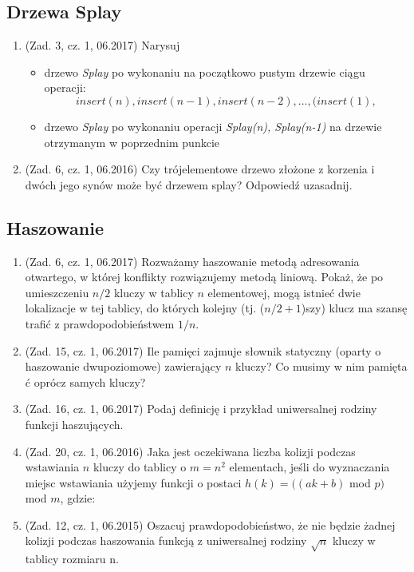 \documentclass[10pt]{article}%
\begin{document}
\subsection*{Drzewa Splay}

\begin{enumerate}

\item (Zad. 3, cz. 1, 06.2017) Narysuj 
\begin{itemize}
	\item drzewo \emph{Splay} po wykonaniu na początkowo pustym drzewie ciągu operacji: $$insert(n),insert(n-1),insert(n-2),...,(insert(1),$$
	\item drzewo \emph{Splay} po wykonaniu operacji \emph{Splay(n), Splay(n-1)} na drzewie otrzymanym w poprzednim punkcie
\end{itemize}

\item (Zad. 6, cz. 1, 06.2016) Czy trójelementowe drzewo złożone z korzenia i dwóch jego synów może być drzewem splay? Odpowiedź uzasadnij.

\end{enumerate}


\subsection*{Haszowanie}

\begin{enumerate}

\item (Zad. 6, cz. 1, 06.2017) Rozważamy haszowanie metodą adresowania otwartego, w której konflikty rozwiązujemy metodą liniową. Pokaż, że po umieszczeniu $n/2$ kluczy w tablicy $n$ elementowej, mogą istnieć dwie lokalizacje w tej tablicy, do których kolejny (tj. ($n/2 + 1$)szy) klucz ma szansę trafić z prawdopodobieństwem $1/n$.

\item (Zad. 15, cz. 1, 06.2017) Ile pamięci zajmuje słownik statyczny (oparty o haszowanie dwupoziomowe) zawierający $n$ kluczy? Co musimy w nim pamięta ć oprócz samych kluczy?

\item (Zad. 16, cz. 1, 06.2017) Podaj definicję i przykład uniwersalnej rodziny funkcji haszujących.

\item (Zad. 20, cz. 1, 06.2016) Jaka jest oczekiwana liczba kolizji podczas wstawiania $n$ kluczy do tablicy o $ m = n^2 $ elementach, jeśli do wyznaczania miejsc wstawiania użyjemy funkcji o postaci $h(k) = ((ak + b)$ mod $p)$ mod $m$, gdzie:

\item (Zad. 12, cz. 1, 06.2015) Oszacuj prawdopodobieństwo, że nie będzie żadnej kolizji podczas haszowania funkcją z uniwersalnej rodziny $\sqrt{n}$ kluczy w tablicy rozmiaru n. 

\end{enumerate}
\end{document}
